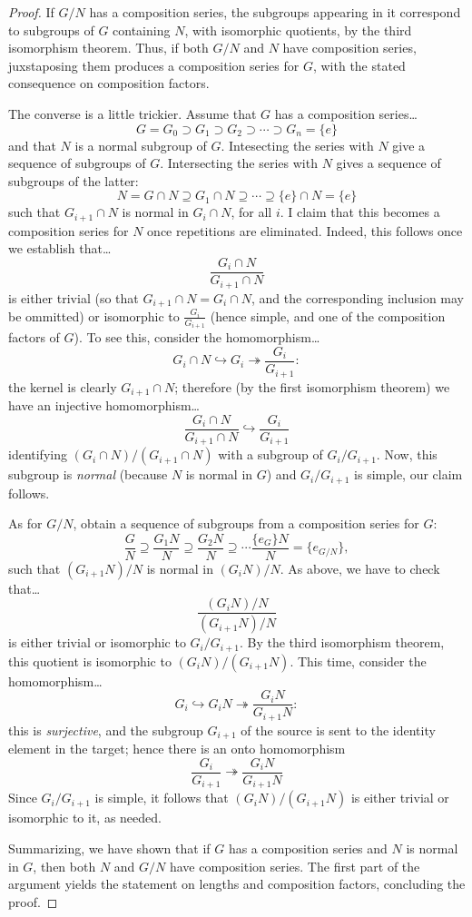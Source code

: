 \begin{proof}
If $G/N$ has a composition series, the subgroups appearing in it correspond to subgroups of $G$ containing $N$, with isomorphic quotients, by the third isomorphism theorem. Thus, if both
$G/N$ and $N$ have composition series, juxstaposing them produces a composition series for $G$, with the stated consequence on composition factors.

The converse is a little trickier. Assume that $G$ has a composition series\dots
$$G = G_0 \supset G_1 \supset G_2 \supset \cdots \supset G_n = \{ e \}$$
and that $N$ is a normal subgroup of $G$. Intesecting the series with $N$ give a sequence of subgroups of $G$. Intersecting the series with $N$ gives a sequence of subgroups of the latter:
$$N = G \cap N \supseteq G_1 \cap N \supseteq \cdots \supseteq \{ e \} \cap N = \{ e \}$$
such that $G_{i+1} \cap N$ is normal in $G_i \cap N$, for all $i$. I claim that this becomes a composition series for $N$ once repetitions are eliminated. Indeed, this follows once we establish that\dots
$$\frac{G_i \cap N}{G_{i+1} \cap N}$$
is either trivial (so that $G_{i+1} \cap N = G_i \cap N$, and the corresponding inclusion may be ommitted) or isomorphic to $\frac{G_i}{G_{i+1}}$ (hence simple, and one of the composition factors of $G$). To
see this, consider the homomorphism\dots
$$G_i \cap N \hookrightarrow G_i \twoheadrightarrow \frac{G_i}{G_{i+1}}:$$
the kernel is clearly $G_{i+1} \cap N$; therefore (by the first isomorphism theorem) we have an injective homomorphism\dots
$$\frac{G_i \cap N}{G_{i+1} \cap N} \hookrightarrow \frac{G_i}{G_{i+1}}$$
identifying $(G_i \cap N) / (G_{i+1} \cap N)$ with a subgroup of $G_i / G_{i+1}$. Now, this subgroup is \emph{normal} (because $N$ is normal in $G$) and $G_i / G_{i+1}$ is simple, our claim follows.

As for $G/N$, obtain a sequence of subgroups from a composition series for $G$:
$$\frac{G}{N} \supseteq \frac{G_1 N}{N} \supseteq \frac{G_2 N}{N} \supseteq \cdots \frac{\{e_G\}N}{N} = \{ e_{G/N} \},$$
such that $(G_{i+1}N)/N$ is normal in $(G_iN)/N$. As above, we have to check that\dots
$$\frac{(G_iN) / N}{(G_{i+1}N) / N}$$
is either trivial or isomorphic to $G_i / G_{i+1}$. By the third isomorphism theorem, this quotient is isomorphic to $(G_iN)/(G_{i+1}N)$. This time, consider the homomorphism\dots
$$G_i \hookrightarrow G_iN \twoheadrightarrow \frac{G_iN}{G_{i+1}N}:$$
this is \emph{surjective}, and the subgroup $G_{i+1}$ of the source is sent to the identity element in the target; hence there is an onto homomorphism
$$\frac{G_i}{G_{i+1}} \twoheadrightarrow \frac{G_iN}{G_{i+1}N}$$
Since $G_i/G_{i+1}$ is simple, it follows that $(G_iN)/(G_{i+1}N)$ is either trivial or isomorphic to it, as needed.

Summarizing, we have shown that if $G$ has a composition series and $N$ is normal in $G$, then both $N$ and $G/N$ have composition series. The first part of the argument yields the statement on lengths
and composition factors, concluding the proof.
\end{proof}

